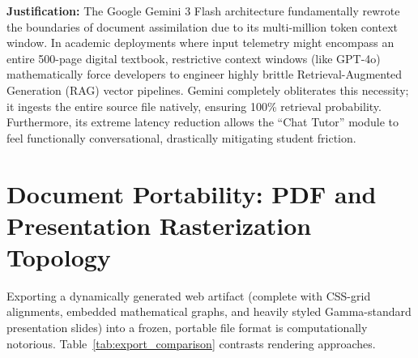 \begin{table}[htbp]
\centering
{}
\vspace{6pt}
\caption{Generative AI endpoint matrix evaluating context volume and latency barriers.}
\label{tab:llm_comparison}
\end{table}

\textbf{Justification:} The Google Gemini 3 Flash architecture fundamentally rewrote the boundaries of document assimilation due to its multi-million token context window. In academic deployments where input telemetry might encompass an entire 500-page digital textbook, restrictive context windows (like GPT-4o) mathematically force developers to engineer highly brittle Retrieval-Augmented Generation (RAG) vector pipelines. Gemini completely obliterates this necessity; it ingests the entire source file natively, ensuring 100\% retrieval probability. Furthermore, its extreme latency reduction allows the ``Chat Tutor'' module to feel functionally conversational, drastically mitigating student friction.

\section{Document Portability: PDF and Presentation Rasterization Topology}
Exporting a dynamically generated web artifact (complete with CSS-grid alignments, embedded mathematical graphs, and heavily styled Gamma-standard presentation slides) into a frozen, portable file format is computationally notorious. Table~\ref{tab:export_comparison} contrasts rendering approaches.


